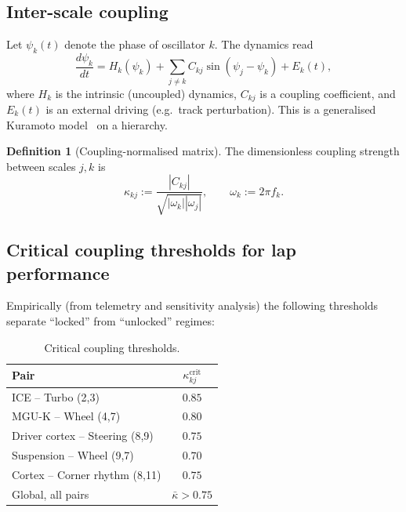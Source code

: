 \documentclass[11pt,twocolumn]{article}
\theoremstyle{definition}
\newtheorem{definition}[theorem]{Definition}
\theoremstyle{remark}
\begin{document}
\subsection{Inter-scale coupling}

Let $\psi_k(t)$ denote the phase of oscillator $k$. The dynamics read
\begin{equation}
  \frac{d\psi_k}{dt} = H_k(\psi_k) + \sum_{j \ne k} C_{kj}\sin(\psi_j - \psi_k) + E_k(t),
  \label{eq:kuramoto-gen}
\end{equation}
where $H_k$ is the intrinsic (uncoupled) dynamics, $C_{kj}$ is a coupling
coefficient, and $E_k(t)$ is an external driving (e.g.\ track perturbation).
This is a generalised Kuramoto model~\cite{kuramoto1984,strogatz2000,pikovsky2001,acebron2005}
on a hierarchy.

\begin{definition}[Coupling-normalised matrix]
\label{def:kappa}
The dimensionless coupling strength between scales $j,k$ is
\begin{equation}
  \kappa_{kj} := \frac{|C_{kj}|}{\sqrt{|\omega_k||\omega_j|}},
  \qquad \omega_k := 2\pi f_k.
\end{equation}
\end{definition}

\subsection{Critical coupling thresholds for lap performance}

Empirically (from telemetry and sensitivity analysis) the following
thresholds separate ``locked'' from ``unlocked'' regimes:

\begin{table}[H]
\centering
\caption{Critical coupling thresholds.}
\label{tab:thresholds}
\begin{tabular}{lc}
\toprule
Pair & $\kappa_{kj}^{\mathrm{crit}}$\\
\midrule
ICE -- Turbo (2,3)                & $0.85$\\
MGU-K -- Wheel (4,7)              & $0.80$\\
Driver cortex -- Steering (8,9)   & $0.75$\\
Suspension -- Wheel (9,7)         & $0.70$\\
Cortex -- Corner rhythm (8,11)    & $0.75$\\
Global, all pairs                 & $\bar\kappa > 0.75$\\
\bottomrule
\end{tabular}
\end{table}
\end{document}
